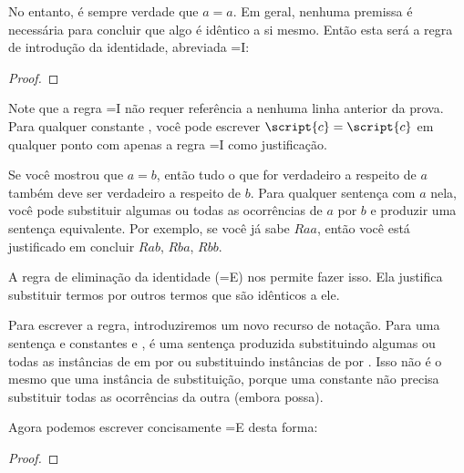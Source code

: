 No entanto, é sempre verdade que $a=a$. Em geral, nenhuma premissa é necessária para concluir que algo é idêntico a si mesmo. Então esta será a regra de introdução da identidade, abreviada {=}I:

\begin{proof}
	 
\end{proof}

Note que a regra {=}I não requer referência a nenhuma linha anterior da prova. Para qualquer constante , você pode escrever $\script{c}=\script{c}$ em qualquer ponto com apenas a regra {=}I como justificação.

Se você mostrou que $a=b$, então tudo o que for verdadeiro a respeito de $a$ também deve ser verdadeiro a respeito de $b$. Para qualquer sentença com $a$ nela, você pode substituir algumas ou todas as ocorrências de $a$ por $b$ e produzir uma sentença equivalente. Por exemplo, se você já sabe $Raa$, então você está justificado em concluir $Rab$, $Rba$, $Rbb$.


A regra de eliminação da identidade ({=}E) nos permite fazer isso. Ela justifica substituir termos por outros termos que são idênticos a ele.

Para escrever a regra, introduziremos um novo recurso de notação. Para uma sentença  e constantes  e ,  é uma sentença produzida substituindo algumas ou todas as instâncias de  em  por  ou substituindo instâncias de  por . Isso não é o mesmo que uma instância de substituição, porque uma constante não precisa substituir todas as ocorrências da outra (embora possa).

Agora podemos escrever concisamente {=}E desta forma:
\begin{proof}
	 
\end{proof}
\nopagebreak





